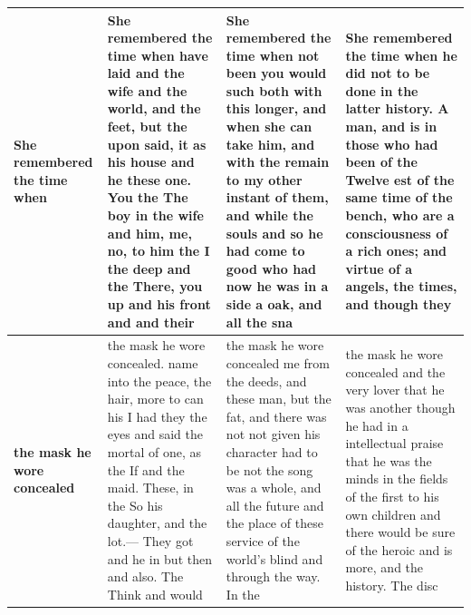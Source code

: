 \begin{table}[t]
\begin{tabular}{p{2cm}p{4.3cm}p{4.3cm}p{4.3cm}}
\midrule
\textbf{She remembered the time when} & She remembered the time when have laid and the wife and the world, and the feet, but the upon said, it as his house and he these one. You the The boy in the wife and him, me, no, to him the I the deep and the There, you up and his front and and their & She remembered the time when not been you would such both with this longer, and when she can take him, and with the remain to my other instant of them, and while the souls and so he had come to good who had now he was in a side a oak, and all the sna & She remembered the time when he did not to be done in the latter history. A man, and is in those who had been of the Twelve est of the same time of the bench, who are a consciousness of a rich ones; and virtue of a angels, the times, and though they  \\
\midrule
\textbf{the mask he wore concealed} & the mask he wore concealed. name into the peace, the hair, more to can his I had they the eyes and said the mortal of one, as the If and the maid. These, in the So his daughter, and the lot.— They got and he in but then and also. The Think and would  & the mask he wore concealed me from the deeds, and these man, but the fat, and there was not not given his character had to be not the song was a whole, and all the future and the place of these service of the world's blind and through the way. In the & the mask he wore concealed and the very lover that he was another though he had in a intellectual praise that he was the minds in the fields of the first to his own children and there would be sure of the heroic and is more, and the history. The disc \\
\midrule
\bottomrule
\end{tabular}
\end{table}

